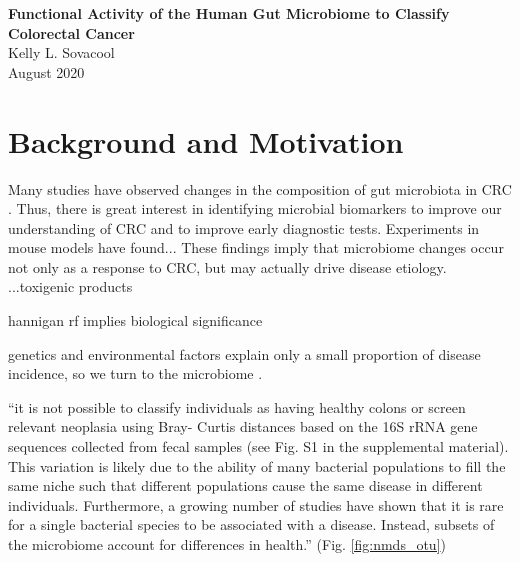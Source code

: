 \documentclass[11pt]{article}
\begin{document}
\sloppy
\begin{center}
\large{\textbf{
    Functional Activity of the Human Gut Microbiome to Classify Colorectal Cancer
}} \\
\vspace{11pt}
\small{
    Kelly L. Sovacool \\
    August 2020
}
\end{center}



\section*{Background and Motivation} %

Many studies have observed changes in the composition of gut microbiota in CRC \cite{kostic_genomic_2012, chen_decreased_2013}.
Thus, there is great interest in identifying microbial biomarkers to improve our understanding of CRC and to improve early diagnostic tests.
Experiments in mouse models have found...
These findings imply that microbiome changes occur not only as a response to CRC,
but may actually drive disease etiology.
...toxigenic products

hannigan rf implies biological significance

genetics and environmental factors explain only a small proportion of disease incidence, so we turn to the microbiome \cite{thomas_metagenomic_2019}.

``it is not possible to classify individuals as having healthy colons or screen relevant neoplasia using Bray- Curtis distances based on the 16S rRNA gene sequences collected from fecal samples (see Fig. S1 in the supplemental material). This variation is likely due to the ability of many bacterial populations to fill the same niche such that different populations cause the same disease in different individuals. Furthermore, a growing number of studies have shown that it is rare for a single bacterial species to be associated with a disease. Instead, subsets of the microbiome account for differences in health.'' \cite{topcuoglu_framework_2020} (Fig. \ref{fig:nmds_otu})
\end{document}
